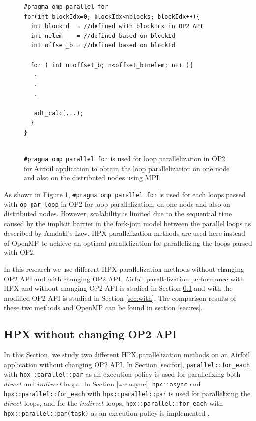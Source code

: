 \documentclass[conference]{IEEEtran}
\begin{document}
\begin{figure} [!h]
    \begin{lstlisting}
#pragma omp parallel for
for(int blockIdx=0; blockIdx<nblocks; blockIdx++){
  int blockId  = //defined with blockIdx in OP2 API
  int nelem    = //defined based on blockId 
  int offset_b = //defined based on blockId
        
  for ( int n=offset_b; n<offset_b+nelem; n++ ){
   .
   .
   .

   adt_calc(...);
  }
}
  
    \end{lstlisting}
    \caption{\small{\texttt{\#pragma omp parallel for} is used for loop parallelization in OP2 for Airfoil application to obtain the loop parallelization on one node and also on the distributed nodes using MPI.}}
    \label{l2}
\end{figure}


As shown in Figure \ref{l2}, \texttt{\#pragma omp parallel for} is used for each loops passed with \texttt{op\_par\_loop} in OP2 for loop parallelization, on one node and also on distributed nodes. However, scalability is limited due to the sequential time  caused by the implicit barrier in the fork-join model \cite{r23} between the parallel loops as described by Amdahl's Law. HPX parallelization methods are used here instead of OpenMP to achieve an optimal parallelization for parallelizing the loops parsed with OP2. 

In this research we use different HPX parallelization methods without changing OP2 API and with changing OP2 API. Airfoil parallelization performance with HPX and without changing OP2 API is studied in Section \ref{sec:without} and with the modified OP2 API is studied in Section \ref{sec:with}. The comparison results of these two methods and OpenMP can be found in section \ref{sec:res}.

\subsection{\textbf{HPX without changing OP2 API}}
\label{sec:without}

In this Section, we study two different HPX parallelization methods on an Airfoil application without changing OP2 API. In Section \ref{sec:for}, \texttt{parallel::for\_each} with \texttt{hpx::parallel::par} as an execution policy is used for parallelizing both $direct$ and $indirect$ loops. In Section \ref{sec:async}, \texttt{hpx::async} and \texttt{hpx::parallel::for\_each} with \texttt{hpx::parallel::par} is used for parallelizing the $direct$ loops, and for the $indirect$ loops, \texttt{hpx::parallel::for\_each} with \texttt{hpx::parallel::par(task)} as an execution policy is implemented . 
\end{document}
